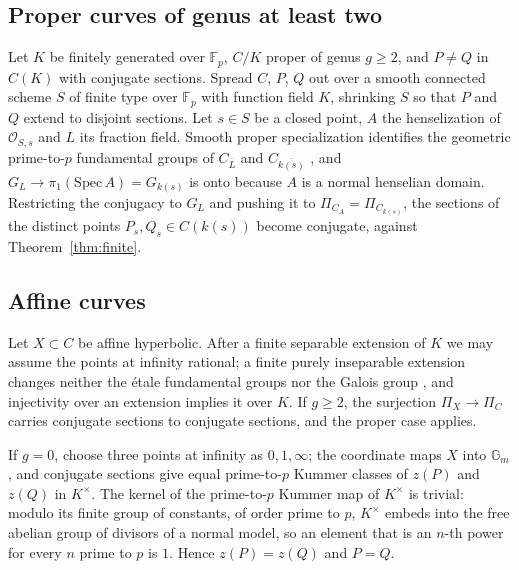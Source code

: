 \documentclass[11pt]{amsart}
\theoremstyle{remark}
\newcommand{\F}{\mathbb F}
\begin{document}
\subsection{Proper curves of genus at least two}
Let $K$ be finitely generated over $\F_p$, $C/K$ proper of genus $g\ge2$, and $P\ne Q$ in $C(K)$ with conjugate sections. Spread $C$, $P$, $Q$ out over a smooth connected scheme $S$ of finite type over $\F_p$ with function field $K$, shrinking $S$ so that $P$ and $Q$ extend to disjoint sections. Let $s\in S$ be a closed point, $A$ the henselization of $\mathcal O_{S,s}$ and $L$ its fraction field. Smooth proper specialization identifies the geometric prime-to-$p$ fundamental groups of $C_{\overline L}$ and $C_{\overline{k(s)}}$ \cite[X, Th\'eor\`eme 3.8, Corollaire 3.9]{SGA1}, and $G_L\to\pi_1(\mathrm{Spec}\,A)=G_{k(s)}$ is onto because $A$ is a normal henselian domain. Restricting the conjugacy to $G_L$ and pushing it to $\Pi_{C_A}=\Pi_{C_{k(s)}}$, the sections of the distinct points $P_s,Q_s\in C(k(s))$ become conjugate, against Theorem~\ref{thm:finite}.

\subsection{Affine curves}
Let $X\subset C$ be affine hyperbolic. After a finite separable extension of $K$ we may assume the points at infinity rational; a finite purely inseparable extension changes neither the \'etale fundamental groups nor the Galois group \cite[IX, Th\'eor\`eme 4.10]{SGA1}, and injectivity over an extension implies it over $K$. If $g\ge2$, the surjection $\Pi_X\to\Pi_C$ carries conjugate sections to conjugate sections, and the proper case applies.

If $g=0$, choose three points at infinity as $0,1,\infty$; the coordinate maps $X$ into $\mathbb G_m$, and conjugate sections give equal prime-to-$p$ Kummer classes of $z(P)$ and $z(Q)$ in $K^\times$. The kernel of the prime-to-$p$ Kummer map of $K^\times$ is trivial: modulo its finite group of constants, of order prime to $p$, $K^\times$ embeds into the free abelian group of divisors of a normal model, so an element that is an $n$-th power for every $n$ prime to $p$ is $1$. Hence $z(P)=z(Q)$ and $P=Q$.
\end{document}
